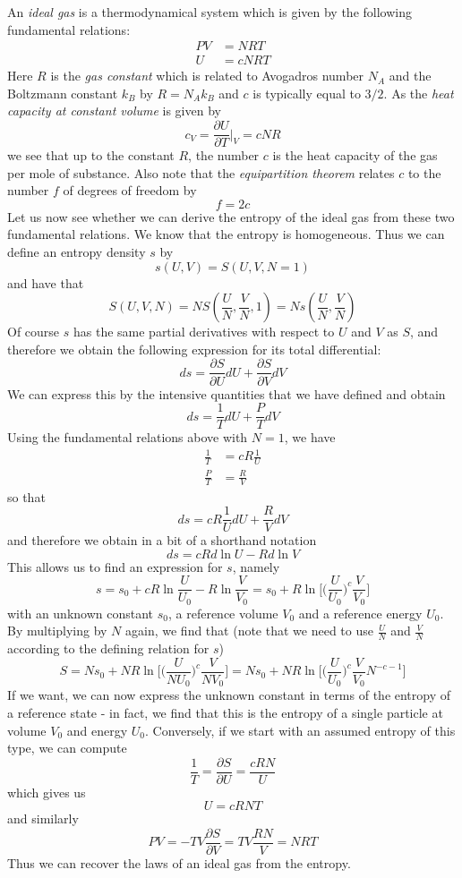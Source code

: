\documentclass[a4paper, draft]{article}
\theoremstyle{own}
\theoremstyle{remark}
\begin{document}
An {\em ideal gas}  is a thermodynamical system which is given by the following fundamental relations:
\begin{align*}
PV &= NRT \\
U &= cNRT
\end{align*}
Here $R$ is the {\em gas constant} which is related to Avogadros number $N_A$ and the Boltzmann constant $k_B$ by $R = N_A k_B$ and $c$ is typically equal to $3/2$. As the {\em heat capacity at constant volume} is given by
$$
c_V = \frac{\partial U}{\partial T}|_V = c N R
$$ 
we see that up to the constant $R$, the number $c$ is the heat capacity of the gas per mole of substance. Also note that the {\em equipartition theorem} relates $c$ to the number $f$ of degrees of freedom by
$$
f = 2c
$$
Let us now see whether we can derive the entropy of the ideal gas from these two fundamental relations. We know that the entropy is homogeneous. Thus we can define an entropy density $s$ by
$$
s(U,V) = S(U,V,N=1)
$$
and have that
$$
S(U,V,N) = N S(\frac{U}{N}, \frac{V}{N}, 1) = N s(\frac{U}{N}, \frac{V}{N})
$$
Of course $s$ has the same partial derivatives with respect to $U$ and $V$ as $S$, and therefore we obtain the following expression for its total differential:
$$
ds = \frac{\partial S}{\partial U} dU + \frac{\partial S}{\partial V} dV
$$
We can express this by the intensive quantities that we have defined and obtain
$$
ds = \frac{1}{T} dU +  \frac{P}{T} dV
$$
Using the fundamental relations above with $N=1$, we have
\begin{align*}
\frac{1}{T} &= cR \frac{1}{U} \\
\frac{P}{T} &= \frac{R}{V} 
\end{align*}
so that
$$
ds = cR \frac{1}{U} dU + \frac{R}{V} dV
$$
and therefore we obtain in a bit of a shorthand notation
$$
ds =  cR d \ln U - R d \ln V
$$
This allows us to find an expression for $s$, namely
$$
s = s_0 + cR \ln \frac{U}{U_0} - R \ln \frac{V}{V_0} = s_0 + R \ln \big[ \big( \frac{U}{U_0} \big)^c \frac{V}{V_0} \big]
$$
with an unknown constant $s_0$, a reference volume $V_0$ and a reference energy $U_0$. 
By multiplying by $N$ again, we find that (note that we need to use $\frac{U}{N}$ and $\frac{V}{N}$ according to the defining relation for $s$)
$$
S = N s_0 + N R \ln \big[ \big( \frac{U}{N U_0} \big)^c \frac{V}{N V_0} \big] = N s_0 + N R \ln \big[ \big( \frac{U}{U_0} \big)^c \frac{V}{V_0} N^{-c - 1}  \big]
$$
If we want, we can now express the unknown constant in terms of the entropy of a reference state - in fact, we find that this is the entropy of a single particle at volume $V_0$ and energy $U_0$. Conversely, if we start with an assumed entropy of this type, we can compute 
$$
\frac{1}{T} = \frac{\partial S}{\partial U} = \frac{cRN}{U}
$$
which gives us
$$
U = cRNT
$$
and similarly 
$$
PV = -TV \frac{\partial S}{\partial V} = TV \frac{RN}{V} = NRT
$$
Thus we can recover the laws of an ideal gas from the entropy. 
\end{document}
